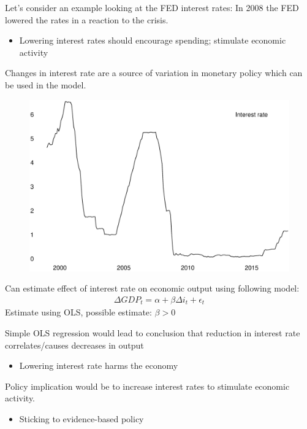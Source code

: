 \documentclass{beamer}
\begin{document}
\begin{frame}
  Let's consider an example looking at the FED interest rates:
  In 2008 the FED lowered the rates in a reaction to the crisis.
  \begin{itemize}
    \item Lowering interest rates should encourage spending; stimulate economic activity
  \end{itemize}
  \medskip
  Changes in interest rate are a source of variation in monetary policy which can be used in the model. 
\end{frame}

\begin{frame}
  \begin{figure}
    \includegraphics[scale=.3]{effective_rate.eps}
  \end{figure}
\end{frame}

\begin{frame}
 Can estimate effect of interest rate on economic output using following model: 
  \begin{align*}
    \Delta GDP_t = \alpha + \beta \Delta i_t + \epsilon_t
  \end{align*}
  \medskip
  Estimate using OLS, possible estimate: $\beta > 0$
\end{frame}


\begin{frame}
  Simple OLS regression would lead to conclusion that reduction in interest rate correlates/causes decreases in output
  \begin{itemize}
    \item Lowering interest rate harms the economy
  \end{itemize}
  \medskip
  Policy implication would be to increase interest rates to stimulate economic activity.
  \begin{itemize}
    \item Sticking to evidence-based policy
  \end{itemize}
\end{frame}
\end{document}
